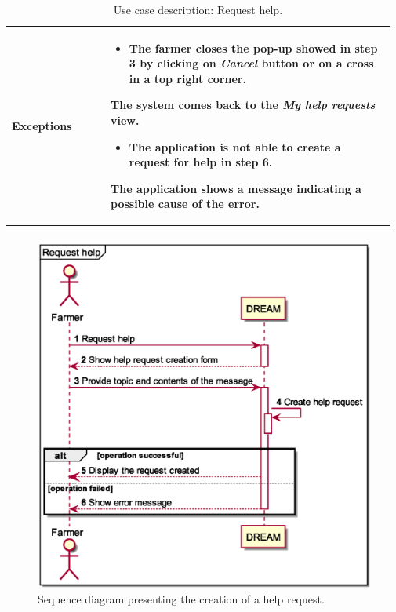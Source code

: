\begin{longtable}{@{}p{0.25\linewidth} p{0.72\linewidth}@{}}
	\textbf{Exceptions}         & \begin{itemize}[leftmargin=.4cm,noitemsep,topsep=0pt,before=\vspace{-3mm}]
	   \item The farmer closes the pop-up showed in step 3 by clicking on \textit{Cancel} button or on a  cross in a top right corner.
	\end{itemize}
    The system comes back to the \textit{My help requests} view.
    \begin{itemize}[leftmargin=.4cm,noitemsep,topsep=0pt]
	   \item The application is not able to create a request for help in step 6. 
	\end{itemize}
	The application shows a message indicating a possible cause of the error.\\
	\bottomrule
	\caption{Use case description: Request help.} 
\end{longtable}

\begin{figure}[H]
    \centering
    \includegraphics[scale=0.6, keepaspectratio, origin=c]{diagrams/sequence/request_help}
    \caption{Sequence diagram presenting the creation of a help request.}
    \label{fig:sd_request_help}
\end{figure}

